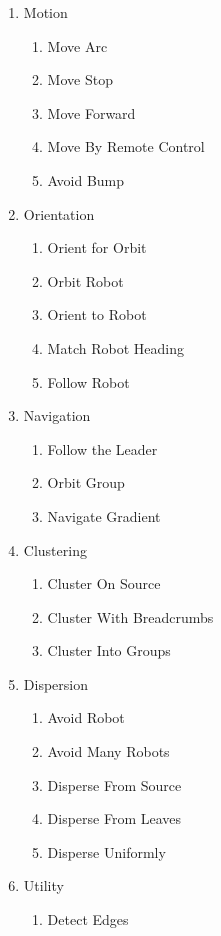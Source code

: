 \documentclass[]{article}
\begin{document}
\begin{enumerate}[noitemsep]
\item Motion
	\begin{enumerate}[noitemsep]
	\item Move Arc
	\item Move Stop
	\item Move Forward
	\item Move By Remote Control
	\item Avoid Bump
	\end{enumerate}
\item Orientation
	\begin{enumerate}[noitemsep]
	\item Orient for Orbit
	\item Orbit Robot
	\item Orient to Robot
	\item Match Robot Heading
	\item Follow Robot
	\end{enumerate}
\item Navigation
	\begin{enumerate}[noitemsep]
	\item Follow the Leader
	\item Orbit Group
	\item Navigate Gradient
	\end{enumerate}
\item Clustering
	\begin{enumerate}[noitemsep]
	\item Cluster On Source
	\item Cluster With Breadcrumbs
	\item Cluster Into Groups
	\end{enumerate}
\item Dispersion
	\begin{enumerate}[noitemsep]
	\item Avoid Robot
	\item Avoid Many Robots
	\item Disperse From Source
	\item Disperse From Leaves
	\item Disperse Uniformly
	\end{enumerate}
\item Utility
	\begin{enumerate}[noitemsep]
	\item Detect Edges
	\end{enumerate}
\end{enumerate}
 
\end{document}
